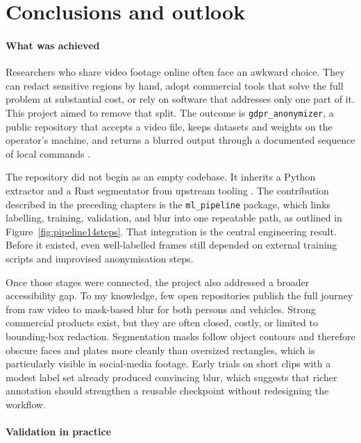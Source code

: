 \section{Conclusions and outlook}
\label{sec:conclusions}

\paragraph{What was achieved}

Researchers who share video footage online often face an awkward choice. They can redact sensitive regions by hand, adopt commercial tools that solve the full problem at substantial cost, or rely on software that addresses only one part of it. This project aimed to remove that split. The outcome is \texttt{gdpr\_anonymizer}, a public repository that accepts a video file, keeps datasets and weights on the operator's machine, and returns a blurred output through a documented sequence of local commands \cite{RepoGDPR}.

The repository did not begin as an empty codebase. It inherits a Python extractor and a Rust segmentator from upstream tooling \cite{DecrypheExtractor,DecrypheSegmentator}. The contribution described in the preceding chapters is the \texttt{ml\_pipeline} package, which links labelling, training, validation, and blur into one repeatable path, as outlined in Figure~\ref{fig:pipeline14steps}. That integration is the central engineering result. Before it existed, even well-labelled frames still depended on external training scripts and improvised anonymisation steps.

Once those stages were connected, the project also addressed a broader accessibility gap. To my knowledge, few open repositories publish the full journey from raw video to mask-based blur for both persons and vehicles. Strong commercial products exist, but they are often closed, costly, or limited to bounding-box redaction. Segmentation masks follow object contours and therefore obscure faces and plates more cleanly than oversized rectangles, which is particularly visible in social-media footage. Early trials on short clips with a modest label set already produced convincing blur, which suggests that richer annotation should strengthen a reusable checkpoint without redesigning the workflow.

\paragraph{Validation in practice}

